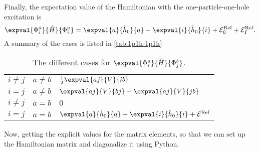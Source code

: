 Finally, the expectation value of the Hamiltonian with the one-particle-one-hole excitation is
\begin{equation}\label{eq:1p1h-1p1h-final}
    \expval{\Phi_i^a}{\hat{H}}{\Phi_i^a} = \expval{a}{\hat{h}_0}{a} - \expval{i}{\hat{h}_0}{i} + \mathcal{E}_0^{\text{Ref}} + \mathcal{E}_I^{\text{Ref}}.
\end{equation}
A summary of the cases is listed in \autoref{tab:1p1h-1p1h}
\begin{table}[ht]
    \centering
    \caption{The different cases for $\expval{\Phi_i^a}{\hat{H}}{\Phi_j^b}$.\label{tab:1p1h-1p1h}}
    \begin{tabular}{lll}
        $i \neq j$ & $a \neq b$ & $\frac{1}{2} \expval{aj}{V}{ib}$ \\
        $i = j$ & $a \neq b$ & $\expval{aj}{V}{bj} - \expval{aj}{V}{jb}$ \\
        $i \neq j$ & $a = b$ & $0$ \\
        $i = j$ & $a = b$ & $\expval{a}{\hat{h}_0}{a} - \expval{i}{\hat{h}_0}{i} + \mathcal{E}^{\text{Ref}}$
    \end{tabular}
\end{table}

Now, getting the explicit values for the matrix elements, so that we can set up the Hamiltonian matrix and diagonalize it using Python.
